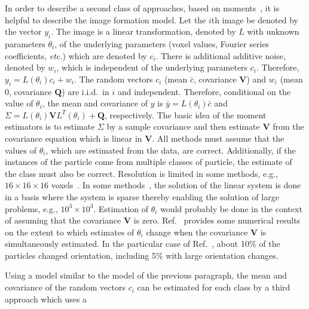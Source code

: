 \par
In order to describe a second class of approaches, based on
moments~\cite{LiaoHashemFrankCovarianceCryoEMStructure2015,LiaoFrankIEEEISBI2010,KatsevichKatsevichSingerCovarianceCryoEMSIAMImagingSciences2015},
it is helpful to describe the image formation model.
Let the $i$th image be denoted by the vector $y_i$.
The image is a linear transformation, denoted by $L$ with unknown
parameters $\theta_i$, of the underlying parameters (voxel values, Fourier
series coefficients, {\em etc.}) which are denoted by $c_i$.
There is additional additive noise, denoted by $w_i$, which is independent
of the underlying parameters $c_i$.
Therefore, $y_i=L(\theta_i)c_i + w_i$.
The random vectors $c_i$ (mean $\bar c$, covariance $\mathbf{V}$) and $w_i$
(mean $0$, covariance $\mathbf{Q}$) are i.i.d.\ in $i$ and independent.
Therefore, conditional on the value of $\theta_i$, the mean and covariance of
$y$ is
$\bar y=L(\theta_i)\bar c$
and
$\Sigma=L(\theta_i)\mathbf{V}L^T(\theta_i) + \mathbf{Q}$,
respectively.
The basic idea of the moment estimators is to estimate $\Sigma$ by a sample
covariance and then estimate $\mathbf{V}$ from the covariance equation which is
linear in $\mathbf{V}$.
All methods must assume that the values of $\theta_i$, which are estimated from
the data, are correct.
Additionally, if the instances of the particle come from multiple classes
of particle, the estimate of the class must also be correct.
Resolution is limited in some methods, e.g., $16\times 16\times 16$
voxels~\cite{LiaoHashemFrankCovarianceCryoEMStructure2015}.
In some
methods~\cite{AndenKatsevichSingerISBI2015,KatsevichKatsevichSingerCovarianceCryoEMSIAMImagingSciences2015},
the solution of the linear system is done in a basis where the system is
sparse thereby enabling the solution of large problems, e.g., $10^3\times 10^3$.
Estimation of $\theta_i$ would probably be done in the context of assuming
that the covariance $\mathbf{V}$ is zero.
Ref.~\cite[Supplemental Figure~1]{YunyeGongVeeslerDoerschukJohnsonJSB2016}
provides some numerical results on the extent to which estimates of
$\theta_i$ change when the covariance $\mathbf{V}$ is simultaneously
estimated.
In the particular case of
Ref.~\cite{YunyeGongVeeslerDoerschukJohnsonJSB2016}, about 10\% of the
particles changed orientation, including 5\% with large orientation
changes.
\par
Using a model similar to the model of the previous paragraph, the mean and
covariance of the random vectors $c_i$ can be estimated for each class by a
third approach which uses a
